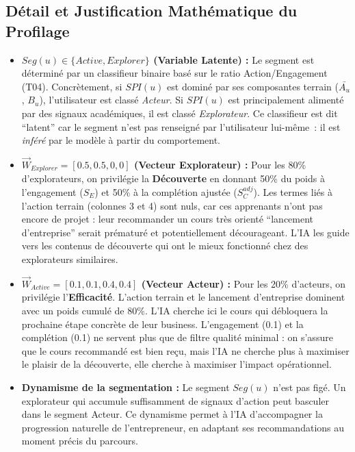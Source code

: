 \documentclass[11pt,a4paper]{article}
\begin{document}
\subsection{Détail et Justification Mathématique du Profilage}
\begin{itemize}
    \item \textbf{$Seg(u) \in \{Active, Explorer\}$ (Variable Latente) :}
    Le segment est déterminé par un classifieur binaire basé sur le ratio Action/Engagement (T04). Concrètement, si $SPI(u)$ est dominé par ses composantes terrain ($\bar{A_u}$, $B_u$), l'utilisateur est classé \textit{Acteur}. Si $SPI(u)$ est principalement alimenté par des signaux académiques, il est classé \textit{Explorateur}. Ce classifieur est dit ``latent'' car le segment n'est pas renseigné par l'utilisateur lui-même~: il est \textit{inféré} par le modèle à partir du comportement.

    \item \textbf{$\vec{W}_{Explorer} = [0.5, 0.5, 0, 0]$ (Vecteur Explorateur) :}
    Pour les 80\% d'explorateurs, on privilégie la \textbf{Découverte} en donnant 50\% du poids à l'engagement ($S_E$) et 50\% à la complétion ajustée ($S_C^{adj}$). Les termes liés à l'action terrain (colonnes 3 et 4) sont nuls, car ces apprenants n'ont pas encore de projet : leur recommander un cours très orienté ``lancement d'entreprise'' serait prématuré et potentiellement décourageant. L'IA les guide vers les contenus de découverte qui ont le mieux fonctionné chez des explorateurs similaires.

    \item \textbf{$\vec{W}_{Active} = [0.1, 0.1, 0.4, 0.4]$ (Vecteur Acteur) :}
    Pour les 20\% d'acteurs, on privilégie l'\textbf{Efficacité}. L'action terrain et le lancement d'entreprise dominent avec un poids cumulé de 80\%. L'IA cherche ici le cours qui débloquera la prochaine étape concrète de leur business. L'engagement (0.1) et la complétion (0.1) ne servent plus que de filtre qualité minimal : on s'assure que le cours recommandé est bien reçu, mais l'IA ne cherche plus à maximiser le plaisir de la découverte, elle cherche à maximiser l'impact opérationnel.

    \item \textbf{Dynamisme de la segmentation :} Le segment $Seg(u)$ n'est pas figé. Un explorateur qui accumule suffisamment de signaux d'action peut basculer dans le segment Acteur. Ce dynamisme permet à l'IA d'accompagner la progression naturelle de l'entrepreneur, en adaptant ses recommandations au moment précis du parcours.
\end{itemize}
\end{document}
